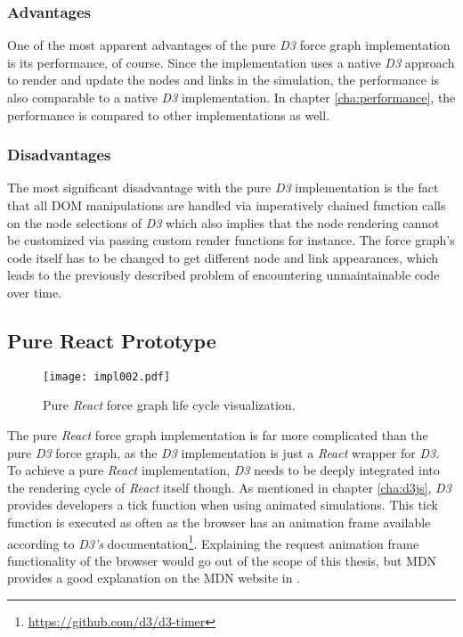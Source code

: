 \subsubsection{Advantages}

One of the most apparent advantages of the pure \emph{D3} force graph implementation is its performance, of course. Since the implementation uses a native \emph{D3} approach to render and update the nodes and links in the simulation, the performance is also comparable to a native \emph{D3} implementation. In chapter \ref{cha:performance}, the performance is compared to other implementations as well.

\subsubsection{Disadvantages}

The most significant disadvantage with the pure \emph{D3} implementation is the fact that all DOM manipulations are handled via imperatively chained function calls on the node selections of \emph{D3} which also implies that the node rendering cannot be customized via passing custom render functions for instance. The force graph's code itself has to be changed to get different node and link appearances, which leads to the previously described problem of encountering unmaintainable code over time.


\subsection{Pure React Prototype}
\label{sec:pureReactPrototype}

\begin{figure}
\centering
\texttt{[image: impl002.pdf]}
\caption{Pure \emph{React} force graph life cycle visualization.}
\label{fig:pureReactLifecycle}
\end{figure}

The pure \emph{React} force graph implementation is far more complicated than the pure \emph{D3} force graph, as the \emph{D3} implementation is just a \emph{React} wrapper for \emph{D3}. To achieve a pure \emph{React} implementation, \emph{D3} needs to be deeply integrated into the rendering cycle of \emph{React} itself though. As mentioned in chapter \ref{cha:d3js}, \emph{D3} provides developers a tick function when using animated simulations. This tick function is executed as often as the browser has an animation frame available according to \emph{D3's} documentation\footnote{\url{https://github.com/d3/d3-timer}}. Explaining the request animation frame functionality of the browser would go out of the scope of this thesis, but MDN provides a good explanation on the MDN website in \cite{RAF}.

